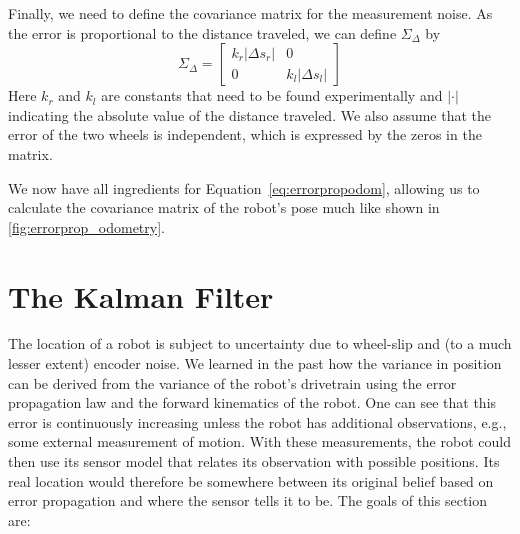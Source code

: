 Finally, we need to define the covariance matrix for the measurement noise. As the error is proportional to the distance traveled, we can define $ \Sigma_{\Delta}$ by
\begin{equation}
\Sigma_{\Delta}=\left[\begin{array}{cc}k_r|\Delta s_r| & 0\\0 & k_l|\Delta s_l|\end{array}\right]
\end{equation}
Here $ k_r$ and $ k_l$ are constants that need to be found experimentally and $ |\cdot |$ indicating the absolute value of the distance traveled. We also assume that the error of the two wheels is independent, which is expressed by the zeros in the matrix.

We now have all ingredients for Equation~\ref{eq:errorpropodom}, allowing us to calculate the covariance matrix of the robot's pose much like shown in \cref{fig:errorprop_odometry}.

\section{The Kalman Filter}
The location of a robot is subject to uncertainty due to wheel-slip and (to a much lesser extent) encoder noise. We learned in the past how the variance in position can be derived from the variance of the robot's drivetrain using the error propagation law and the forward kinematics of the robot. One can see that this error is continuously increasing unless the robot has additional observations, e.g., some external measurement of motion.
With these measurements, the robot could then use its sensor model that relates its observation with possible positions.
Its real location would therefore be somewhere between its original belief based on error propagation and where the sensor tells it to be.
The goals of this section are:

